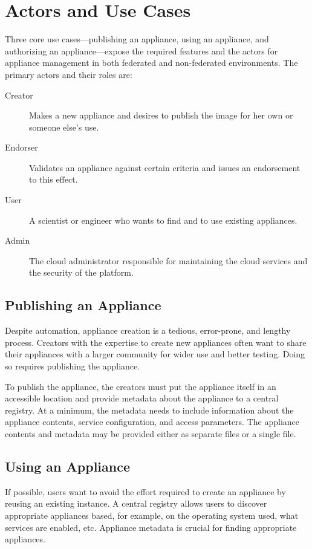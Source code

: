 \section{Actors and Use Cases}
\label{sec:use-cases}

Three core use cases---publishing an appliance, using an appliance, and
authorizing an appliance---expose the required features and the actors
for appliance management in both federated and non-federated
environments.  The primary actors and their roles are:
\begin{description}
\item[Creator] Makes a new appliance and desires to publish the image
  for her own or someone else's use.
\item[Endorser] Validates an appliance against certain criteria and
  issues an endorsement to this effect.
\item[User] A scientist or engineer who wants to find and to use
  existing appliances.
\item[Admin] The cloud administrator responsible for
  maintaining the cloud services and the security of the platform.
\end{description}

\subsection{Publishing an Appliance}

Despite automation, appliance creation is a tedious, error-prone, and
lengthy process.  Creators with the expertise to create new
appliances often want to share their appliances with a larger
community for wider use and better testing.  Doing so requires
publishing the appliance.

To publish the appliance, the creators must put the appliance itself
in an accessible location and provide metadata about the appliance to a
central registry.  At a minimum, the metadata needs to include
information about the appliance contents, service configuration, and
access parameters.  The appliance contents and metadata may be 
provided either as separate files or a single file.

\subsection{Using an Appliance}

If possible, users want to avoid the effort required to create an
appliance by reusing an existing instance.  A central registry allows
users to discover appropriate appliances based, for example, on the
operating system used, what services are enabled, etc.  Appliance
metadata is crucial for finding appropriate appliances.

